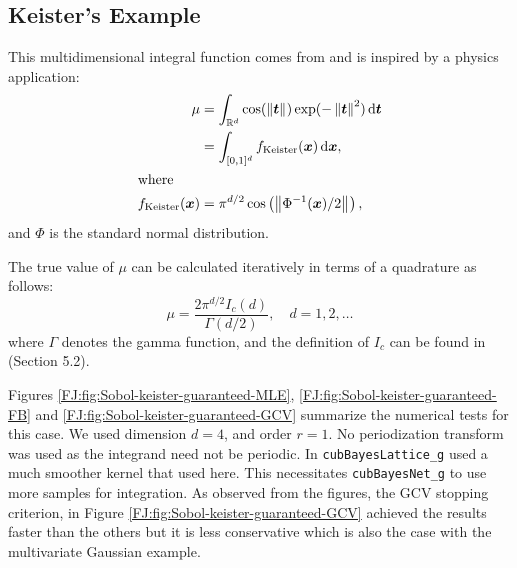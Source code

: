 \documentclass[graybox,footinfo]{svmult}
\newcommand{\norm}[2][{}]{\ensuremath{\left \lVert #2 \right \rVert}_{#1}}
\begin{document}
\subsection{Keister's Example}

This multidimensional integral function comes from \cite{Kei96} and is inspired by a physics application:
\begin{align}
\label{FJ:eqn:keister_integral}
\mu & =  \int_{\R^d} \cos(\norm{ \bst}) \exp(-\norm{ \bst }^2) \, \textup{d}\bst \\
\nonumber
& = \int_{[0,1]^d} f_{\textup{Keister}}(\bsx) \, \textup{d}\bsx,\\
\intertext{where }
\nonumber
f_\textup{Keister}(\bsx) &= \pi^{d/2} \cos\left(\norm{ \Phi^{-1}(\bsx)/2}\right)  ,
\end{align}
and $\Phi$ is the standard normal distribution.

The true value of $\mu$ can be calculated iteratively in terms of a quadrature as follows:  
\begin{equation*}
\mu = \frac{2 \pi^{d/2} I_c(d)}{\Gamma(d/2)}, \quad d=1,2, \ldots
\end{equation*}
where $\Gamma$ denotes the gamma function, and the definition of $I_c$ can be found in \cite{RatHic19a} (Section 5.2).


Figures \ref{FJ:fig:Sobol-keister-guaranteed-MLE}, \ref{FJ:fig:Sobol-keister-guaranteed-FB} and \ref{FJ:fig:Sobol-keister-guaranteed-GCV} summarize the numerical tests for this case. We used  dimension $d=4$, and order $r=1$.  No periodization transform was used as the integrand need not be periodic. 
In \cite{RatHic19a} \texttt{cubBayesLattice\_g} used a much smoother kernel that used here.
This necessitates \texttt{cubBayesNet\_g} to use more samples for integration.
As observed from the figures, the GCV stopping criterion, in Figure \ref{FJ:fig:Sobol-keister-guaranteed-GCV} achieved the results faster than the others but it is less conservative which is also the case with the multivariate Gaussian example.
\end{document}
